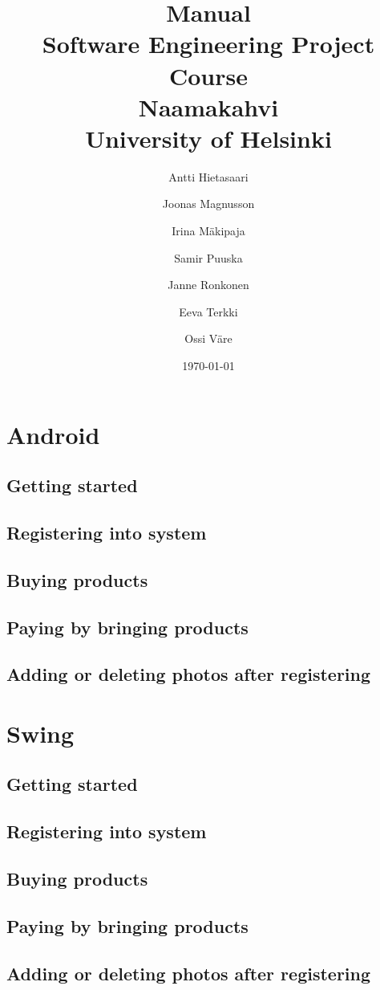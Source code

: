 \documentclass[11pt]{article}
\title{Manual\\
  Software Engineering Project Course\\
  Naamakahvi\\
  University of Helsinki}
\author{Antti Hietasaari
  \and Joonas Magnusson
  \and Irina Mäkipaja
  \and Samir Puuska
  \and Janne Ronkonen
  \and Eeva Terkki
  \and Ossi Väre}
\date{\today}
\begin{document}
\maketitle

\tableofcontents



\section{Android}
\subsection{Getting started}
\subsection{Registering into system}
\subsection{Buying products}
\subsection{Paying by bringing products}
\subsection{Adding or deleting photos after registering}

\section{Swing}
\subsection{Getting started}
\subsection{Registering into system}
\subsection{Buying products}
\subsection{Paying by bringing products}
\subsection{Adding or deleting photos after registering}
\end{document}
